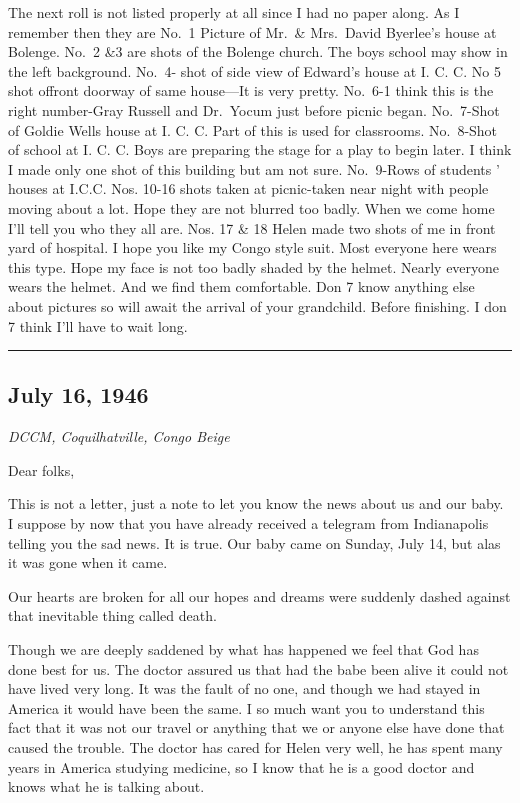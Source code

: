 \documentclass[
]{book}
\begin{document}
The next roll is not listed properly at all since I had no paper along. As I remember then they are No.~1 Picture of Mr.~\& Mrs.~David Byerlee's house at Bolenge. No.~2 \&3 are shots of the Bolenge church. The boys school may show in the left background. No.~4- shot of side view of Edward's house at I. C. C. No 5 shot offront doorway of same house---It is very pretty. No.~6-1 think this is the right number-Gray Russell and Dr.~Yocum just before picnic began. No.~7-Shot of Goldie Wells house at I. C. C. Part of this is used for classrooms. No.~8-Shot of school at I. C. C. Boys are preparing the stage for a play to begin later. I think I made only one shot of this building but am not sure. No.~9-Rows of students ' houses at I.C.C. Nos. 10-16 shots taken at picnic-taken near night with people moving about a lot. Hope they are not blurred too badly. When we come home I'll tell you who they all are. Nos. 17 \& 18 Helen made two shots of me in front yard of hospital. I hope you like my Congo style suit. Most everyone here wears this type. Hope my face is not too badly shaded by the helmet. Nearly everyone wears the helmet. And we find them comfortable. Don 7 know anything else about pictures so will await the arrival of your grandchild. Before finishing. I don 7 think I'll have to wait long.

\begin{center}\rule{0.5\linewidth}{0.5pt}\end{center}

\hypertarget{july-16-1946}{%
\subsection{July 16, 1946}\label{july-16-1946}}

\emph{DCCM, Coquilhatville, Congo Beige}

Dear folks,

This is not a letter, just a note to let you know the news about us and our baby. I suppose by now that you have already received a telegram from Indianapolis telling you the sad news. It is true. Our baby came on Sunday, July 14, but alas it was gone when it came.

Our hearts are broken for all our hopes and dreams were suddenly dashed against that inevitable thing called death.

Though we are deeply saddened by what has happened we feel that God has done best for us. The doctor assured us that had the babe been alive it could not have lived very long. It was the fault of no one, and though we had stayed in America it would have been the same. I so much want you to understand this fact that it was not our travel or anything that we or anyone else have done that caused the trouble. The doctor has cared for Helen very well, he has spent many years in America studying medicine, so I know that he is a good doctor and knows what he is talking about.
\end{document}
